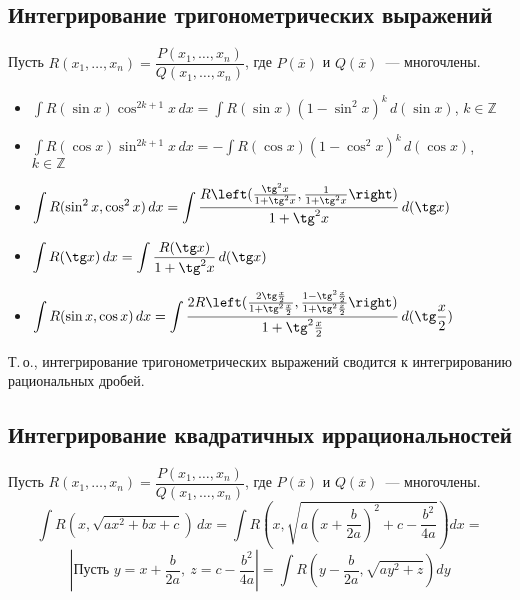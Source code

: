 \subsection{Интегрирование тригонометрических выражений}
Пусть $R(x_1, \ldots, x_n) = \dfrac{P(x_1, \ldots, x_n)}{Q(x_1, \ldots, x_n)}$, где $P(\overline x)$ и $Q(\overline x)$~--- многочлены.
\begin{itemize}
	\item $\int R(\sin x) \cos^{2k+1} x\,dx = \int R(\sin x) (1 - \sin^2 x)^k\,d(\sin x)$, $k \in \mathbb Z$
	
	\item $\int R(\cos x) \sin^{2k+1} x\,dx = -\int R(\cos x) (1 - \cos^2 x)^k\,d(\cos x)$, $k \in \mathbb Z$
	
	\item $\displaystyle \int R(\sin^2 x, \cos^2 x)\,dx = \int \frac
	{R\left( \frac{\tg^2 x}{1 + \tg^2 x}, \frac1{1 + \tg^2 x} \right)}
	{1 + \tg^2 x}\,d(\tg x)$
	
	\item $\displaystyle \int R(\tg x)\,dx = \int \frac{R(\tg x)}{1 + \tg^2 x}\,d(\tg x)$
	
	\item $\displaystyle \int R(\sin x, \cos x)\,dx = \int \frac
	{2R\left( \frac{2\tg \frac{x}2}{1 + \tg^2 \frac{x}2}, \frac{1 - \tg^2 \frac{x}2}{1 + \tg^2 \frac{x}2} \right)}
	{1 + \tg^2 \frac{x}2}\,d(\tg \frac{x}2)$
\end{itemize}

Т.\,о., интегрирование тригонометрических выражений сводится к интегрированию рациональных дробей.

\subsection{Интегрирование квадратичных иррациональностей}
Пусть $R(x_1, \ldots, x_n) = \dfrac{P(x_1, \ldots, x_n)}{Q(x_1, \ldots, x_n)}$, где $P(\overline x)$ и $Q(\overline x)$~--- многочлены.
\begin{equation*}
\int R(x, \sqrt{ax^2 + bx + c})\,dx =
\int R\left( x, \sqrt{a \left( x + \frac{b}{2a} \right)^2 + c - \frac{b^2}{4a}} \right) dx =
\end{equation*}
\begin{equation*}
\left| \text{Пусть } y = x + \frac{b}{2a}, \ z = c - \frac{b^2}{4a} \right| =
\int R\left( y - \frac{b}{2a}, \sqrt{ay^2 + z} \right) dy
\end{equation*}

